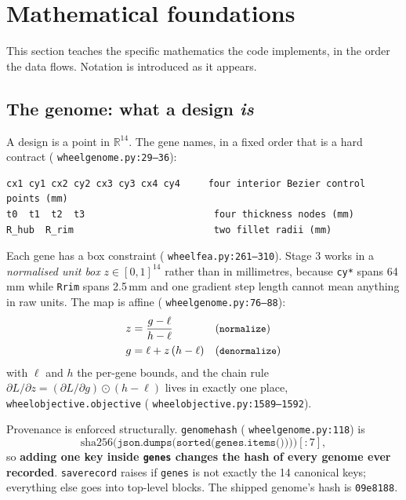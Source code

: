 \documentclass[11pt,a4paper]{article}
\DeclareRobustCommand{\code}[1]{%
  \texttt{\small\def\_{\textunderscore\discretionary{}{}{}}#1}}
\newcommand{\at}[2]{\code{#1:#2}}
\begin{document}
\section{Mathematical foundations}
\label{sec:math}

This section teaches the specific mathematics the code implements, in the order the
data flows. Notation is introduced as it appears.

\subsection{The genome: what a design \emph{is}}
\label{sec:genome}

A design is a point in $\mathbb{R}^{14}$. The gene names, in a fixed order that is a
hard contract (\at{wheel\_genome.py}{29--36}):

\begin{lstlisting}
cx1 cy1 cx2 cy2 cx3 cy3 cx4 cy4     four interior Bezier control points (mm)
t0  t1  t2  t3                       four thickness nodes (mm)
R_hub  R_rim                         two fillet radii (mm)
\end{lstlisting}

Each gene has a box constraint (\at{wheel\_fea.py}{261--310}). Stage 3 works in a
\emph{normalised unit box} $z \in [0,1]^{14}$ rather than in millimetres, because
\code{cy*} spans 64\,mm while \code{R\_rim} spans 2.5\,mm and one gradient step length
cannot mean anything in raw units. The map is affine (\at{wheel\_genome.py}{76--88}):
%
\begin{align}
  z &= \frac{g - \ell}{h - \ell} && \text{(\code{normalize})} \\
  g &= \ell + z\,(h - \ell)      && \text{(\code{denormalize})}
\end{align}
%
with $\ell$ and $h$ the per-gene bounds, and the chain rule
$\partial L/\partial z = (\partial L/\partial g) \odot (h - \ell)$ lives in exactly one
place, \code{wheel\_objective.objective} (\at{wheel\_objective.py}{1589--1592}).

Provenance is enforced structurally. \code{genome\_hash} (\at{wheel\_genome.py}{118})
is
%
\begin{equation*}
  \mathrm{sha256}\bigl(\texttt{json.dumps(sorted(genes.items()))}\bigr)[{:}7],
\end{equation*}
%
so \textbf{adding one key inside \code{genes} changes the hash of every genome ever
recorded}. \code{save\_record} raises if \code{genes} is not exactly the 14 canonical
keys; everything else goes into top-level blocks. The shipped genome's hash is
\code{09e8188}.
\end{document}
